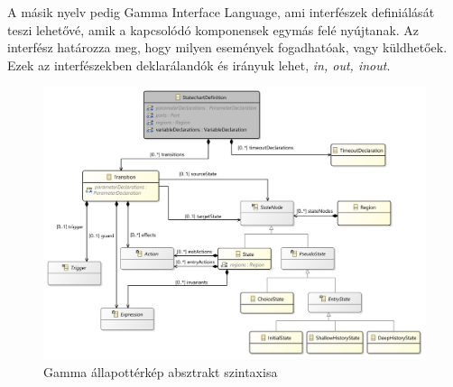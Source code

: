 A másik nyelv pedig Gamma Interface Language, ami interfészek definiálását teszi lehetővé, amik a kapcsolódó komponensek egymás felé nyújtanak. Az interfész határozza meg, hogy milyen események fogadhatóak, vagy küldhetőek. Ezek az interfészekben deklarálandók és irányuk lehet, \emph{in, out, inout}.
\begin{figure}[!ht]
	\centering
	\includegraphics[keepaspectratio, width=150mm]{figures/statechart_class_diagram.png}
	\caption{Gamma állapottérkép absztrakt szintaxisa}
	\label{fig:gamma_statechart_model}
\end{figure}



